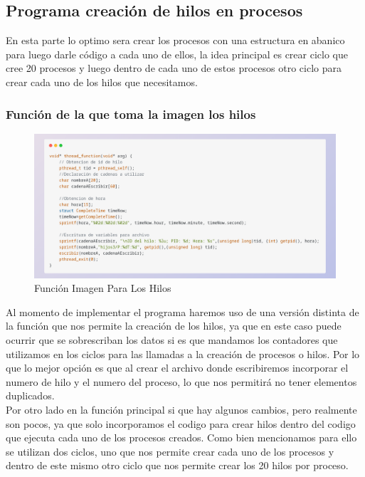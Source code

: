 \documentclass[10pt]{article}
\begin{document}
	\subsection{Programa creación de hilos en procesos}
	En esta parte lo optimo sera crear los procesos con una estructura en abanico para luego darle código a cada uno de ellos, la idea principal es crear ciclo que cree 20 procesos y luego dentro de cada uno de estos procesos otro ciclo para crear cada uno de los hilos que necesitamos.  
	\subsubsection{Función de la que toma la imagen los hilos}
	\begin{figure}[h!]
		\centering
		\includegraphics[width=\linewidth]{funH2.png}
		\caption{Función Imagen Para Los Hilos}
		\label{fig:funH2}
	\end{figure}
	Al momento de implementar el programa haremos uso de una versión distinta de la función que nos permite la creación de los hilos, ya que en este caso puede ocurrir que se sobrescriban los datos si es que mandamos los contadores que utilizamos en los ciclos para las llamadas a la creación de procesos o hilos. Por lo que lo mejor opción es que al crear el archivo donde escribiremos incorporar el numero de hilo y el numero del proceso, lo que nos permitirá no tener elementos duplicados. 
	\\
	Por otro lado en la función principal si que hay algunos cambios, pero realmente son pocos, ya que solo incorporamos el codigo para crear hilos dentro del codigo que ejecuta cada uno de los procesos creados. Como bien mencionamos para ello se utilizan dos ciclos, uno que nos permite crear cada uno de los procesos y dentro de este mismo otro ciclo que nos permite crear los 20 hilos por proceso. 
\end{document}
